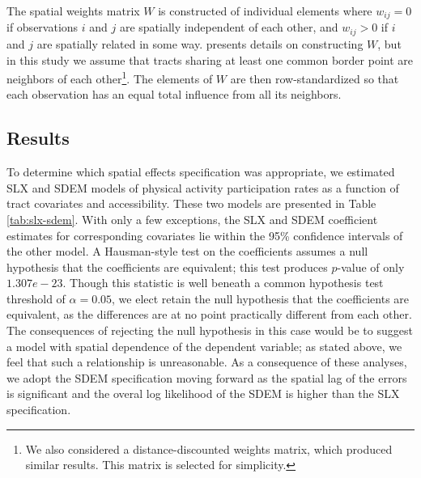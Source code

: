 \documentclass[shortAfour,sageh.bst]{sagej}
\begin{document}
The spatial weights matrix \(W\) is constructed of individual elements
where \(w_{ij} = 0\) if observations \(i\) and \(j\) are spatially
independent of each other, and \(w_{ij} > 0\) if \(i\) and \(j\) are
spatially related in some way. \citet{Dubin1998} presents details on
constructing \(W\), but in this study we assume that tracts sharing at
least one common border point are neighbors of each other\footnote{We
  also considered a distance-discounted weights matrix, which produced
  similar results. This matrix is selected for simplicity.}. The
elements of \(W\) are then row-standardized so that each observation has
an equal total influence from all its neighbors.

\hypertarget{results}{%
\subsection{Results}\label{results}}

To determine which spatial effects specification was appropriate, we
estimated SLX and SDEM models of physical activity participation rates
as a function of tract covariates and accessibility. These two models
are presented in Table \ref{tab:slx-sdem}. With only a few exceptions,
the SLX and SDEM coefficient estimates for corresponding covariates lie
within the 95\% confidence intervals of the other model. A Hausman-style
test \citep{Pace2008} on the coefficients assumes a null hypothesis that
the coefficients are equivalent; this test produces \(p\)-value of only
\(1.307e-23\). Though this statistic is well beneath a common hypothesis
test threshold of \(\alpha = 0.05\), we elect retain the null hypothesis
that the coefficients are equivalent, as the differences are at no point
practically different from each other. The consequences of rejecting the
null hypothesis in this case would be to suggest a model with spatial
dependence of the dependent variable; as stated above, we feel that such
a relationship is unreasonable. As a consequence of these analyses, we
adopt the SDEM specification moving forward as the spatial lag of the
errors is significant and the overal log likelihood of the SDEM is
higher than the SLX specification.
\end{document}
